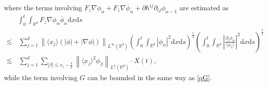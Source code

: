 \documentclass[10pt,twoside,a4paper]{article}
\numberwithin{equation}{section}\allowdisplaybreaks
\def\leq{\leqslant}
\begin{document}
where  the terms involving $ F_z\nabla \phi_\alpha+F_{\overline{z}}\nabla \overline{\phi}_\alpha+\partial h^{ij}\partial_{ij }  \phi_{\alpha -1}$ are estimated as
\begin{align*} 
	&	\int_0^t \int_{\mathbb{R}^d}      F_z\nabla \phi_\alpha  \overline{\phi}_{\alpha } \mathrm{d} x \mathrm{d} s\\
	\lesssim &\,\sum_{j=1}^d \left\| \langle x_j\rangle\left(|\phi|+| \nabla\phi|\right)  \right\|_{L^\infty(\mathbb{R}^d)}  \left(\int_0^t     \int_{\mathbb{R}^{d}} \left|   \phi_{\alpha }   \right|^2  \mathrm{d} x \mathrm{d} s\right)^{\frac 12}   \left(\int_0^t     \int_{\mathbb{R}^{d}} \left|\frac{\partial_j \phi_{\alpha }  } {\langle x_j\rangle}\right|^2  \mathrm{d} x \mathrm{d} s\right)^{\frac 12}\nonumber\\
	\lesssim &\,\sum_{j=1}^d\sum_{|\beta| \leq s_1-\frac 32}\left\| \langle x_j\rangle^2 \phi_{\beta}\right\|_{L^2(\mathbb{R}^d)} \cdot X(t),\nonumber
\end{align*}
while
the term   involving $ G $ can be bounded in the same way as \eqref{qG}.
\end{document}
